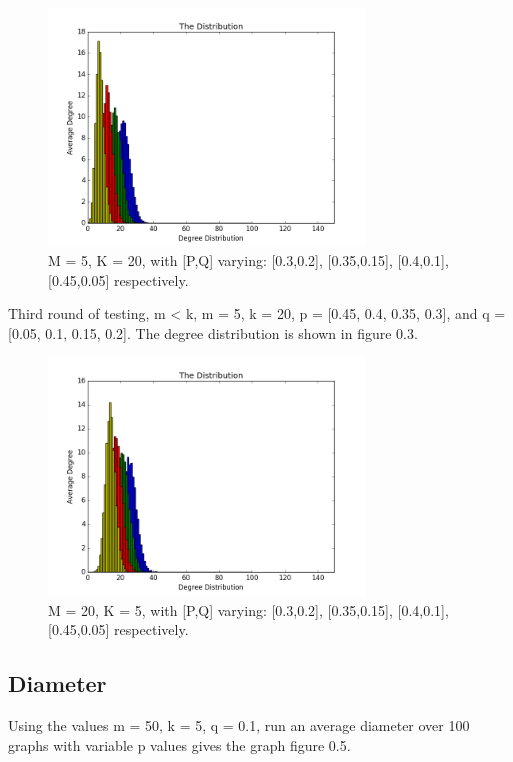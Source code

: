 \documentclass[paper=a4, fontsize=11pt]{scrartcl}
\numberwithin{equation}{section}		%
\numberwithin{figure}{section}			%
\numberwithin{table}{section}				%
\begin{document}
\begin{figure}[p]
\center
\caption{M = 5, K = 20, with [P,Q] varying: [0.3,0.2], [0.35,0.15], [0.4,0.1], [0.45,0.05] respectively.}
\includegraphics[width=0.75\textwidth]{pictures/m>k.png}
\end{figure}

Third round of testing, m < k, m = 5, k = 20, p = [0.45, 0.4, 0.35, 0.3], and q = [0.05, 0.1, 0.15, 0.2]. The degree distribution is shown in figure 0.3.

\begin{figure}[p]
\center
\caption{M = 20, K = 5, with [P,Q] varying: [0.3,0.2], [0.35,0.15], [0.4,0.1], [0.45,0.05] respectively.}
\includegraphics[width=0.75\textwidth]{pictures/m<k.png}
\end{figure}

\subsection*{Diameter}

Using the values m = 50, k = 5, q = 0.1, run an average diameter over 100 graphs with variable p values gives the graph figure 0.5.
\end{document}
